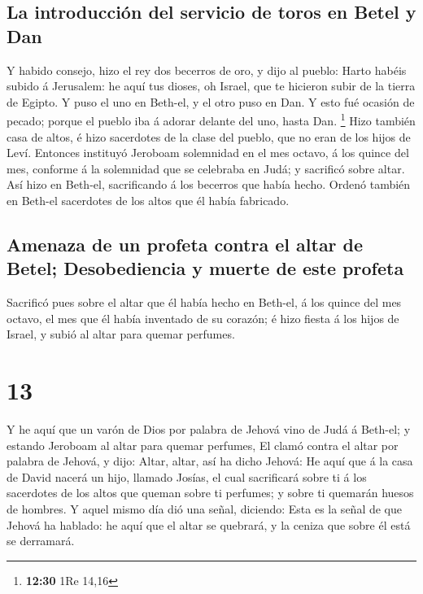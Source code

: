 \hypertarget{la-introducciuxf3n-del-servicio-de-toros-en-betel-y-dan}{%
\subsection{La introducción del servicio de toros en Betel y
Dan}\label{la-introducciuxf3n-del-servicio-de-toros-en-betel-y-dan}}

 Y habido consejo, hizo el rey dos becerros de oro, y
dijo al pueblo: Harto habéis subido á Jerusalem: he aquí tus dioses, oh
Israel, que te hicieron subir de la tierra de Egipto.  Y
puso el uno en Beth-el, y el otro puso en Dan.  Y esto
fué ocasión de pecado; porque el pueblo iba á adorar delante del uno,
hasta Dan. \footnote{\textbf{12:30} 1Re 14,16}  Hizo
también casa de altos, é hizo sacerdotes de la clase del pueblo, que no
eran de los hijos de Leví.  Entonces instituyó Jeroboam
solemnidad en el mes octavo, á los quince del mes, conforme á la
solemnidad que se celebraba en Judá; y sacrificó sobre altar. Así hizo
en Beth-el, sacrificando á los becerros que había hecho. Ordenó también
en Beth-el sacerdotes de los altos que él había fabricado.

\hypertarget{amenaza-de-un-profeta-contra-el-altar-de-betel-desobediencia-y-muerte-de-este-profeta}{%
\subsection{Amenaza de un profeta contra el altar de Betel;
Desobediencia y muerte de este
profeta}\label{amenaza-de-un-profeta-contra-el-altar-de-betel-desobediencia-y-muerte-de-este-profeta}}

 Sacrificó pues sobre el altar que él había hecho en
Beth-el, á los quince del mes octavo, el mes que él había inventado de
su corazón; é hizo fiesta á los hijos de Israel, y subió al altar para
quemar perfumes.

\hypertarget{section-12}{%
\section{13}\label{section-12}}

 Y he aquí que un varón de Dios por palabra de Jehová vino
de Judá á Beth-el; y estando Jeroboam al altar para quemar perfumes,
 El clamó contra el altar por palabra de Jehová, y dijo:
Altar, altar, así ha dicho Jehová: He aquí que á la casa de David nacerá
un hijo, llamado Josías, el cual sacrificará sobre ti á los sacerdotes
de los altos que queman sobre ti perfumes; y sobre ti quemarán huesos de
hombres.  Y aquel mismo día dió una señal, diciendo: Esta
es la señal de que Jehová ha hablado: he aquí que el altar se quebrará,
y la ceniza que sobre él está se derramará.

